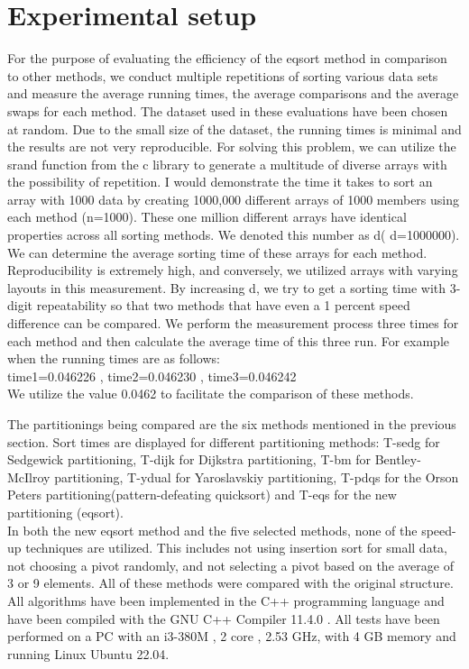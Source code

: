 \documentclass{article}
\begin{document}
\section {Experimental setup}
 For the purpose of evaluating the efficiency of the eqsort method in comparison to other methods, we conduct multiple repetitions of sorting various data sets and measure the average  running times, the average comparisons and the average swaps for each method. The dataset used in these evaluations have been chosen at random. Due to the small size of the dataset, the running times is minimal and the results are not very reproducible. For solving this problem, we can utilize the srand function from the c library to generate a multitude of diverse arrays with the possibility of repetition. I would demonstrate the time it takes to sort an array with 1000 data by creating 1000,000 different arrays of 1000 members using each method (n=1000). These one million different arrays have identical properties across all sorting methods. We denoted this number as d( d=1000000). We can determine the average sorting time of these arrays for each method. Reproducibility is extremely high, and conversely, we utilized arrays with varying layouts in this measurement. By increasing d, we try to get a sorting time with 3-digit repeatability so that two methods that have even a 1 percent speed difference can be compared.  We perform the measurement process three times for each method and then calculate the average time  of this three run. For example when the running times are as follows:\\
time1=0.046226 ,   time2=0.046230   ,   time3=0.046242 \\
We utilize the value 0.0462 to facilitate the comparison of these methods.

The partitionings being compared are the six methods mentioned in the previous section. Sort times are displayed for different partitioning methods: T-sedg for Sedgewick partitioning, T-dijk for Dijkstra partitioning, T-bm for Bentley-McIlroy partitioning, T-ydual for Yaroslavskiy partitioning, T-pdqs for the Orson Peters partitioning(pattern-defeating quicksort) and T-eqs for the new partitioning (eqsort).\\
In both the new eqsort method and the five selected methods, none of the speed-up techniques are utilized. This includes not using insertion sort for small data, not choosing a pivot randomly, and not selecting a pivot based on the average of 3 or 9 elements. All of these methods were compared with the original structure.
All algorithms have been implemented in the C++ programming language and have been compiled with the GNU C++ Compiler 11.4.0 .  All tests have been performed on a PC with an i3-380M , 2 core , 2.53 GHz, with 4 GB memory and running Linux Ubuntu 22.04.
\end{document}
